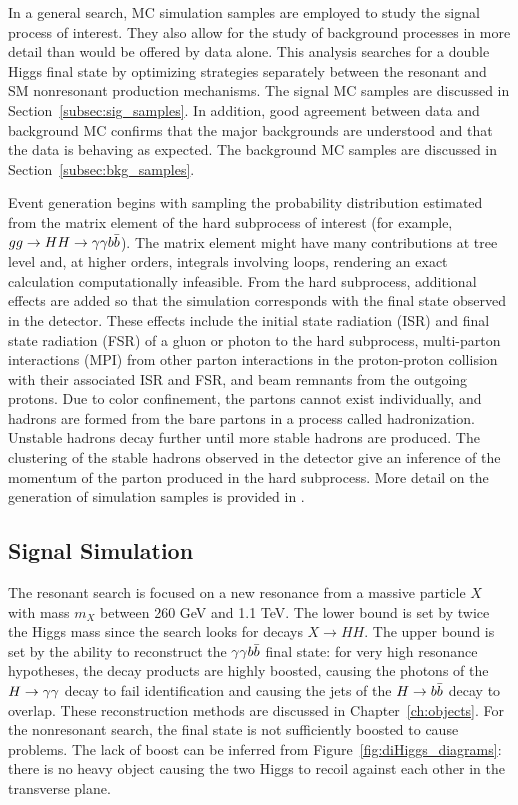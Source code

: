 
In a general search, MC simulation samples are employed to study the signal process of interest.
They also allow for the study of background processes in more detail
than would be offered by data alone.
This analysis searches for a double Higgs final
state by optimizing strategies separately between the resonant and
SM nonresonant production mechanisms.
The signal MC samples are discussed in Section~\ref{subsec:sig_samples}.
In addition, good agreement between data
and background MC confirms that the major backgrounds are understood and that
the data is behaving as expected. The background MC samples are discussed in
Section~\ref{subsec:bkg_samples}.

Event generation begins with sampling the probability distribution
estimated from the matrix element of the hard subprocess of interest
(for example, $gg\rightarrow HH\rightarrow \gamma\gamma b\bar{b}$). The matrix element
might have many contributions at tree level and, at higher orders, integrals involving loops, rendering
an exact calculation computationally infeasible.
From the hard subprocess, additional effects are added so that the simulation corresponds with
the final state observed in the detector. These effects include the initial state radiation (ISR)
and final state radiation (FSR) of a gluon or photon to the hard subprocess, multi-parton
interactions (MPI) from other parton interactions in the proton-proton collision with their
associated ISR and FSR, and beam remnants from the outgoing protons. Due to color confinement,
the partons cannot exist individually, and hadrons are formed from the bare partons in
a process called hadronization. Unstable hadrons decay further until more stable hadrons are
produced. The clustering of the stable hadrons observed in the detector give an inference of the
momentum of the parton produced in the hard subprocess.
More detail on the generation of simulation samples is provided in \cite{Dobbs:2004qw,Bartalini:2011jp}.

\subsection{Signal Simulation\label{subsec:sig_samples}}

The resonant search is focused on a new resonance from a massive particle $X$ with mass $m_X$ between
260 GeV and 1.1 TeV. The lower bound is set by twice the Higgs mass since the search looks for decays
$X\rightarrow HH$. The upper bound is set by the ability to reconstruct the $\gamma\gamma b\bar{b}$ final state: for
very high resonance hypotheses, the decay products are highly boosted, causing the photons of the
$H\to\gamma\gamma$ decay to fail identification and causing the jets of the $H\to b\bar{b}$ decay to overlap.
These reconstruction methods are discussed in Chapter~\ref{ch:objects}. For the nonresonant
search, the final state is not sufficiently boosted to cause problems. The lack of boost can be
inferred from Figure~\ref{fig:diHiggs_diagrams}: there is no heavy object causing the two Higgs
to recoil against each other in the transverse plane.

